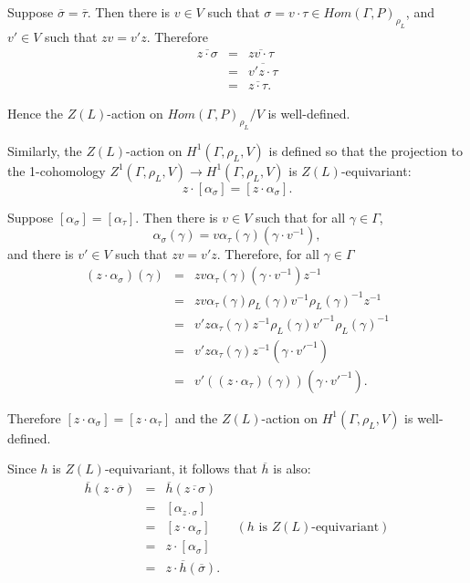 Suppose $\overline{\sigma} = \overline{\tau}$. Then there is $v \in V$ such that $\sigma = v \cdot \tau \in Hom(\Gamma, P)_{\rho_L}$, and $v' \in V$ such that $zv = v' z$. Therefore
\begin{eqnarray*}
  \overline{z \cdot \sigma} &=& \overline{zv \cdot \tau} \\
  &=& \overline{v' z \cdot \tau} \\
  &=& \overline{z \cdot \tau}.
\end{eqnarray*}

Hence the $Z(L)$-action on $Hom(\Gamma, P)_{\rho_L}/V$ is well-defined.

Similarly, the $Z(L)$-action on $H^1(\Gamma, \rho_L, V)$ is defined so that the projection to the 1-cohomology $Z^1(\Gamma, \rho_L, V) \rightarrow H^1(\Gamma, \rho_L, V)$ is $Z(L)$-equivariant:
\begin{displaymath}
  z \cdot [\alpha_\sigma] = [z \cdot \alpha_\sigma].
\end{displaymath}

Suppose $[\alpha_\sigma] = [\alpha_\tau]$. Then there is $v \in V$ such that for all $\gamma \in \Gamma$,
\begin{displaymath}
  \alpha_\sigma(\gamma) = v \alpha_\tau(\gamma) (\gamma \cdot v^{-1}),
\end{displaymath}
and there is $v' \in V$ such that $zv = v' z$. Therefore, for all $\gamma \in \Gamma$
\begin{eqnarray*}
	(z \cdot \alpha_\sigma)(\gamma) 
  &=& z v \alpha_\tau(\gamma) (\gamma \cdot v^{-1}) z^{-1} \\
  &=& z v \alpha_\tau(\gamma) \rho_L(\gamma) v^{-1} \rho_L(\gamma)^{-1} z^{-1} \\
  &=& v' z \alpha_\tau(\gamma) z^{-1} \rho_L(\gamma) v'^{-1} \rho_L(\gamma)^{-1} \\
  &=& v' z \alpha_\tau(\gamma) z^{-1} (\gamma \cdot v'^{-1}) \\
  &=& v' ((z \cdot \alpha_\tau)(\gamma)) (\gamma \cdot v'^{-1}).
\end{eqnarray*}

Therefore $[z \cdot \alpha_\sigma] = [z \cdot \alpha_\tau]$ and the $Z(L)$-action on $H^1(\Gamma, \rho_L, V)$ is well-defined.

Since $h$ is $Z(L)$-equivariant, it follows that $\overline{h}$ is also:
\begin{eqnarray*}
  \overline{h}(z \cdot \overline{\sigma}) &=& \overline{h}(\overline{z \cdot \sigma}) \\
  &=& [\alpha_{z \cdot \sigma}] \\
  &=& [z \cdot \alpha_\sigma] \qquad (h \textrm{ is } Z(L) \textrm{-equivariant}) \\
  &=& z \cdot [\alpha_\sigma] \\
  &=& z \cdot \overline{h}(\overline{\sigma}).
\end{eqnarray*}

